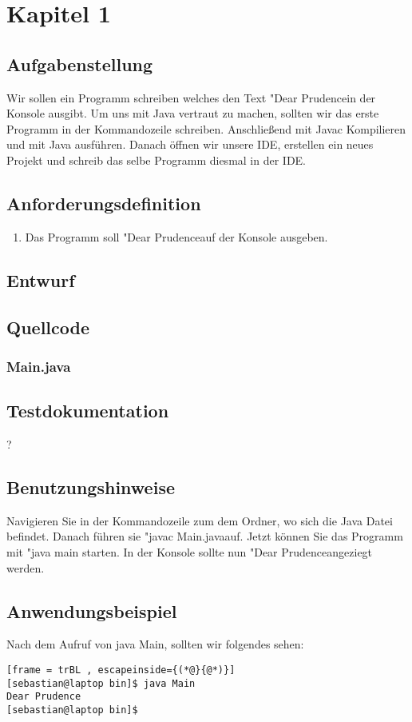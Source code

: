 \section{Kapitel 1}
\subsection{Aufgabenstellung}
Wir sollen ein Programm schreiben welches den Text "Dear Prudence\dq \space in der Konsole ausgibt. 
Um uns mit Java vertraut zu machen, sollten wir das erste Programm in der Kommandozeile schreiben.
Anschlie\ss end mit Javac Kompilieren und mit Java ausführen. Danach öffnen wir unsere IDE, erstellen
ein neues Projekt und schreib das selbe Programm diesmal in der IDE.

\subsection{Anforderungsdefinition}
\begin{enumerate}
	\item Das Programm soll "Dear Prudence\dq \space auf der Konsole ausgeben.
\end{enumerate}

\subsection{Entwurf}


\subsection{Quellcode}
\subsubsection{Main.java}


\subsection{Testdokumentation}
?

\subsection{Benutzungshinweise}
Navigieren Sie in der Kommandozeile zum dem Ordner, wo sich die Java Datei befindet.
Danach führen sie "javac Main.java\dq \space auf. Jetzt können Sie das Programm mit "java main\dq \space
 starten. In der Konsole sollte nun "Dear Prudence\dq \space angeziegt werden.

\subsection{Anwendungsbeispiel}
Nach dem Aufruf von java Main, sollten wir folgendes sehen:
\begin{lstlisting}[frame = trBL , escapeinside={(*@}{@*)}]
[sebastian@laptop bin]$ java Main 
Dear Prudence
[sebastian@laptop bin]$ 
\end{lstlisting}